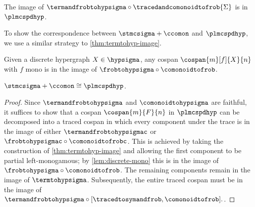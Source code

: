 \begin{corollary}
    The image of \(
        \termandfrobtohypsigma \circ \tracedandcomonoidtofrob{\Sigma}
    \) is in \(\plmcspdhyp\).
\end{corollary}

To show the correspondence between \(\stmcsigma + \ccomon\) and
\(\plmcspdhyp\), we use a similar strategy to \cref{thm:termtohyp-image}.

\begin{lemma}\label{lem:discrete-mono}
    Given a discrete hypergraph \(X \in \hypsigma\), any cospan
    \(\cospan{m}[f]{X}{n}\) with \(f\) mono is in the image of
    \(\frobtohypsigma \circ \comonoidtofrob\).
\end{lemma}

\begin{theorem}\label{thm:comonoid-fully-complete}
    \(\stmcsigma + \ccomon \cong \plmcspdhyp\).
\end{theorem}
\begin{proof}
    Since \(\termandfrobtohypsigma\) and \(\comonoidtohypsigma\) are faithful,
    it suffices to show that a cospan \(\cospan{m}{F}{n}\) in
    \(\plmcspdhyp\) can be decomposed into a traced cospan in which every
    component under the trace is in the image of either
    \(\termandfrobtohypsigmac\) or \(\frobtohypsigmac \circ \comonoidtofrobc\).
    This is achieved by taking the construction of \cref{thm:termtohyp-image}
    and allowing the first component to be partial left-monogamous; by
    \cref{lem:discrete-mono} this is in the image of
    \(\frobtohypsigma \circ \comonoidtofrob\).
    The remaining components remain in the image of \(\termtohypsigma\).
    Subsequently, the entire traced cospan must be in the image of \(
        \termandfrobtohypsigma \circ [\tracedtosymandfrob, \comonoidtofrob].
    \).
\end{proof}

